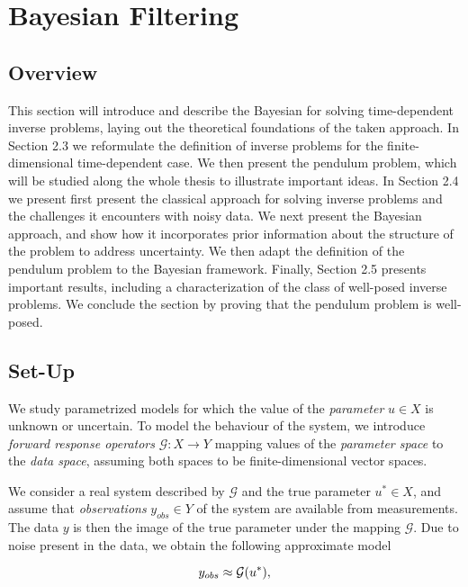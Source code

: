 \section{Bayesian Filtering}
\subsection{Overview}

This section will introduce and describe the Bayesian for solving time-dependent inverse problems, laying out the theoretical foundations of the taken approach. In Section 2.3 we reformulate the definition of inverse problems for the finite-dimensional time-dependent case. We then present the pendulum problem, which will be studied along the whole thesis to illustrate important ideas. In Section 2.4 we present first present the classical approach for solving inverse problems and the challenges it encounters with noisy data. We next present the Bayesian approach, and show how it incorporates prior information about the structure of the problem to address uncertainty. We then adapt the definition of the pendulum problem to the Bayesian framework. Finally, Section 2.5 presents important results, including a characterization of the class of well-posed inverse problems. We conclude the section by proving that the pendulum problem is well-posed.

\subsection{Set-Up}

We study parametrized models for which the value of the \textit{parameter} $u \in X$ is unknown or uncertain. To model the behaviour of the system, we introduce \textit{forward response operators} $\mathcal{G} : X \rightarrow Y$ mapping values of the \textit{parameter space} to the \textit{data space}, assuming both spaces to be finite-dimensional vector spaces.

We consider a real system described by $\mathcal{G}$ and the true parameter $u^* \in X$, and assume that \textit{observations} $y_{obs} \in Y$ of the system are available from measurements. The data $y$ is then the image of the true parameter under the mapping $\mathcal{G}$. Due to noise present in the data, we obtain the following approximate model

\begin{equation}\label{inverse-formula}
  y_{obs} \approx \mathcal{G}(u^*),
\end{equation}

